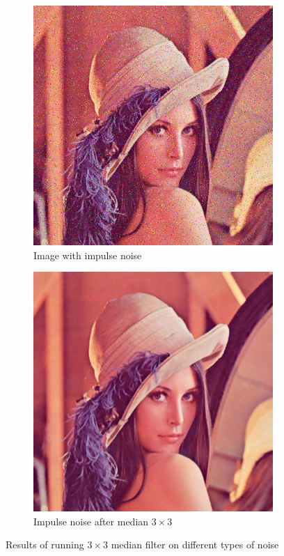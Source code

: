 \documentclass[12pt]{article}
\begin{document}
\begin{figure}[ht]
\begin{subfigure}[t]{.4\textwidth}
        \includegraphics[width=.8\textwidth]{lenac_impulse3}
        \caption{Image with impulse noise}
    \end{subfigure}
    \begin{subfigure}[t]{.4\textwidth}\centering
        \includegraphics[width=.8\textwidth]{lenac_impulse_median}
        \caption{Impulse noise after median $3\times3$}
    \end{subfigure}
    \caption{Results of running $3\times3$ median filter on different types of noise}
\end{figure}
\end{document}
